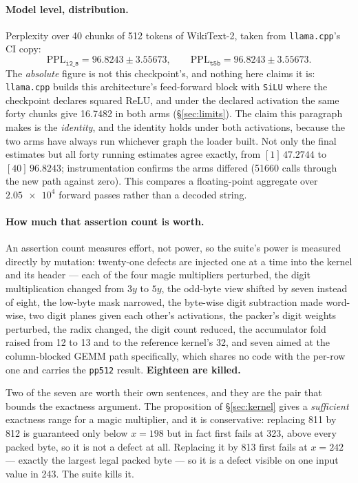 \documentclass[11pt,a4paper]{article}
\newcommand{\code}[1]{\texttt{#1}}
\begin{document}
\paragraph{Model level, distribution.} Perplexity over 40 chunks of 512
tokens of WikiText-2, taken from \code{llama.cpp}'s CI copy:
\[
\mathrm{PPL}_{\code{i2\_s}}=\num{96.8243}\pm\num{3.55673},\qquad
\mathrm{PPL}_{\code{t5b}}=\num{96.8243}\pm\num{3.55673}.
\]
The \emph{absolute} figure is not this checkpoint's, and nothing here claims it
is: \code{llama.cpp} builds this architecture's feed-forward block with
\code{SiLU} where the checkpoint declares squared ReLU, and under the declared
activation the same forty chunks give \num{16.7482} in both arms
(\S\ref{sec:limits}). The claim this paragraph makes is the \emph{identity},
and the identity holds under both activations, because the two arms have always
run whichever graph the loader built.
Not only the final estimates but all forty running estimates agree exactly, from
$[1]\,\num{47.2744}$ to $[40]\,\num{96.8243}$; instrumentation confirms the arms
differed (\num{51660} calls through the new path against zero). This compares a
floating-point aggregate over $\num{2.05e4}$ forward passes rather than a
decoded string.

\paragraph{How much that assertion count is worth.} An assertion count measures
effort, not power, so the suite's power is measured directly by mutation:
twenty-one defects are injected one at a time into the kernel and its header ---
each of the four magic multipliers perturbed, the digit multiplication changed
from $3y$ to $5y$, the odd-byte view shifted by seven instead of eight, the
low-byte mask narrowed, the byte-wise digit subtraction made word-wise, two
digit planes given each other's activations, the packer's digit weights
perturbed, the radix changed,
the digit count reduced, the accumulator fold raised from 12 to 13 and to
the reference kernel's 32, and seven aimed at the column-blocked GEMM path specifically, which
shares no code with the per-row one and carries the \code{pp512} result.
\textbf{Eighteen are killed.}

Two of the seven are worth their own sentences, and they are the pair that
bounds the exactness argument. The proposition of
\S\ref{sec:kernel} gives a \emph{sufficient} exactness range for a magic
multiplier, and it is conservative: replacing 811 by 812 is guaranteed only
below $x = 198$ but in fact first fails at 323, above every packed byte, so it
is not a defect at all. Replacing it by 813 first fails at $x = 242$ --- exactly
the largest legal packed byte --- so it is a defect visible on one input value
in 243. The suite kills it.
\end{document}
